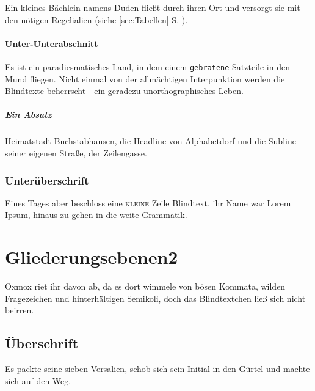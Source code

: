 \documentclass[%
	12pt,%
	a4paper,%
	oneside,%
 liststotoc, idxtotoc, bibtotoc, %
	halfparskip,%
	nochapterprefix,%
	appendixprefix, %
smallheadings,%
]{scrreprt}
\begin{document}
Ein kleines Bächlein namens Duden fließt durch ihren Ort und versorgt sie mit den nötigen Regelialien (siehe \ref{sec:Tabellen} S. \pageref{sec:Tabellen}).

\subsubsection{Unter-Unterabschnitt}

Es ist ein paradiesmatisches Land, in dem einem \texttt{gebratene} Satzteile in den Mund fliegen. Nicht einmal von der allmächtigen Interpunktion werden die Blindtexte beherrscht - ein geradezu unorthographisches Leben. 

\paragraph{Ein Absatz}
Heimatstadt Buchstabhausen, die Headline von Alphabetdorf und die Subline seiner eigenen Straße, der Zeilengasse.

\subsection{Unterüberschrift}

Eines Tages aber beschloss eine \textsc{kleine} Zeile Blindtext, ihr Name war Lorem Ipsum, hinaus zu gehen in die weite Grammatik.

\chapter{Gliederungsebenen2}
\label{sec:Gliederung2}

Oxmox riet ihr davon ab, da es dort wimmele von bösen Kommata, wilden Fragezeichen und hinterhältigen Semikoli, doch das Blindtextchen ließ sich nicht beirren. 

\section{Überschrift}

Es packte seine sieben Versalien, schob sich sein Initial in den Gürtel und machte sich auf den Weg. 
\end{document}
